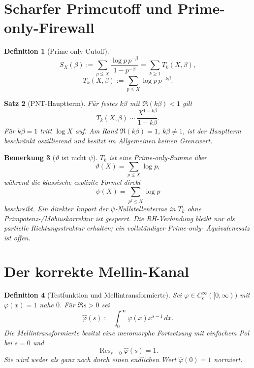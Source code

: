 \documentclass[11pt,a4paper]{amsart}
\newtheorem{theorem}{Satz}[section]
\newtheorem{definition}[theorem]{Definition}
\newtheorem{remark}[theorem]{Bemerkung}
\begin{document}
\section{Scharfer Primcutoff und Prime-only-Firewall}

\begin{definition}[Prime-only-Cutoff]\label{def:sharp-prime-cutoff}
\[
  S_X(\beta)
  :=\sum_{p\le X}\frac{\log p\,p^{-\beta}}{1-p^{-\beta}}
  =\sum_{k\ge1}T_k(X,\beta),
\]
\[
  T_k(X,\beta):=\sum_{p\le X}\log p\,p^{-k\beta}.
\]
\end{definition}

\begin{theorem}[PNT-Hauptterm]\label{thm:prime-layer-main}
Für festes $k\beta$ mit $\Re(k\beta)<1$ gilt
\[
  T_k(X,\beta)
  \sim\frac{X^{1-k\beta}}{1-k\beta}.
\]
Für $k\beta=1$ tritt $\log X$ auf. Am Rand $\Re(k\beta)=1$,
$k\beta\ne1$, ist der Hauptterm beschränkt oszillierend und besitzt im
Allgemeinen keinen Grenzwert.
\end{theorem}

\begin{remark}[$\vartheta$ ist nicht $\psi$]\label{rem:theta-psi}
$T_k$ ist eine Prime-only-Summe über
\[
  \vartheta(X)=\sum_{p\le X}\log p,
\]
während die klassische explizite Formel direkt
\[
  \psi(X)=\sum_{p^j\le X}\log p
\]
beschreibt. Ein direkter Import der $\psi$-Nullstellenterme in $T_k$ ohne
Primpotenz-/Möbiuskorrektur ist gesperrt. Die RH-Verbindung bleibt nur als
partielle Richtungsstruktur erhalten; ein vollständiger Prime-only-
Äquivalenzsatz ist offen.
\end{remark}

\section{Der korrekte Mellin-Kanal}

\begin{definition}[Testfunktion und Mellintransformierte]
\label{def:mellin-test}
Sei $\varphi\in C_c^\infty([0,\infty))$ mit $\varphi(x)=1$ nahe $0$. Für
$\Re s>0$ sei
\[
  \widehat\varphi(s)
  :=\int_0^\infty\varphi(x)x^{s-1}\,dx.
\]
Die Mellintransformierte besitzt eine meromorphe Fortsetzung mit einfachem
Pol bei $s=0$ und
\[
  \operatorname{Res}_{s=0}\widehat\varphi(s)=1.
\]
Sie wird weder als ganz noch durch einen endlichen Wert
$\widehat\varphi(0)=1$ normiert.
\end{definition}
\end{document}
